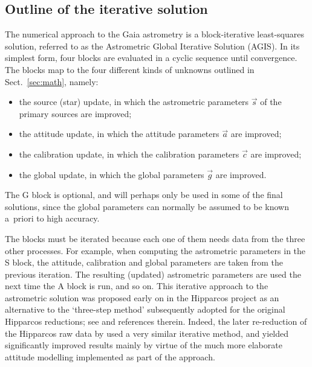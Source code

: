 \documentclass[structabstract]{aa}
\begin{document}
\subsection{Outline of the iterative solution} \label{sec:agis}

The numerical approach to the Gaia astrometry is a block-iterative least-squares
solution, referred to as the Astrometric Global Iterative Solution (AGIS).
In its simplest form, four blocks are evaluated in a cyclic sequence until
convergence. The blocks map to the four different kinds of unknowns outlined
in Sect.~\ref{sec:math}, namely:
\begin{itemize}
\item[S:] the source (star) update, in which the astrometric parameters $\vec{s}$
of the primary sources are improved;
\item[A:] the attitude update, in which the attitude parameters $\vec{a}$ are
improved;
\item[C:] the calibration update, in which the calibration parameters $\vec{c}$
are improved;
\item[G:] the global update, in which the global parameters $\vec{g}$ are improved.
\end{itemize}
The G block is optional, and will perhaps only be used in some of the final solutions,
since the global parameters can normally be assumed to be known a~priori to high
accuracy.

The blocks must be iterated because each one of them needs data from the three other
processes. For example, when computing the astrometric parameters in the S block,
the attitude, calibration and global parameters are taken from the previous iteration.
The resulting (updated) astrometric parameters are used the next
time the A block is run, and so on. This iterative approach to the astrometric 
solution was proposed early on in the Hipparcos project as an
alternative to the `three-step method' subsequently adopted for the original Hipparcos
reductions; see \citet[][Vol.~3, p.~488]{hip:catalogue} and references therein.
Indeed, the later re-reduction of the Hipparcos raw data by \citet{book:newhip}
used a very similar iterative method, and yielded significantly improved results 
mainly by virtue of the much more elaborate attitude modelling implemented as part
of the approach.
\end{document}
